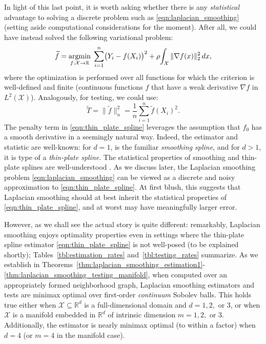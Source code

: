 \documentclass[twoside]{article}
\newcommand{\Reals}{\mathbb{R}}
\newcommand{\1}{\mathbf{1}}
\DeclareMathOperator*{\argmin}{argmin}
\newcommand{\Rd}{\Reals^d}
\newcommand{\Xset}{\mathcal{X}}
\newcommand{\wt}[1]{\widetilde{#1}}
\newcommand{\wh}[1]{\widehat{#1}}
\theoremstyle{definition}
\theoremstyle{remark}
\begin{document}
In light of this last point, it is worth asking whether there is any \emph{statistical} advantage to solving a discrete problem such as \eqref{eqn:laplacian_smoothing} (setting aside computational considerations for the moment). After all, we could have instead solved the following variational problem:
\begin{equation}
\label{eqn:thin_plate_spline}
\wt{f} = \argmin_{f : \Xset \to \Reals} \; \sum_{i = 1}^{n} \bigl(Y_i - f(X_i)\bigr)^2 + \rho \hspace{-2pt} \int_{\Xset} \|\nabla f(x)\|_2^2 \,dx,
\end{equation}
where the optimization is performed over all functions for which the criterion is well-defined and finite (continuous functions $f$ that have a weak derivative $\nabla f$ in $L^2(\Xset)$). Analogously, for testing, we could use:
\begin{equation}
\label{eqn:thin_plate_spline_test}
\wt{T} = \| \wt{f} \|_n^2 = \frac{1}{n} \sum_{i=1}^n \wt{f}(X_i)^2.
\end{equation}
The penalty term in \eqref{eqn:thin_plate_spline} leverages the assumption that $f_0$ has a smooth derivative in a seemingly natural way. Indeed, the estimator \smash{$\wt{f}$} and statistic \smash{$\wt{T}$} are well-known: for $d = 1$, \smash{$\wt{f}$} is the familiar \emph{smoothing spline}, and for $d>1$, it is type of a \emph{thin-plate spline}. The statistical properties of smoothing and thin-plate splines are well-understood \citep{vandergeer2000,liu2019}. As we discuss later, the Laplacian smoothing problem \eqref{eqn:laplacian_smoothing} can be viewed as a discrete and noisy approximation to \eqref{eqn:thin_plate_spline}. At first blush, this suggests that Laplacian smoothing should at best inherit the statistical properties of \eqref{eqn:thin_plate_spline}, and at worst may have meaningfully larger error.

However, as we shall see the actual story is quite different: remarkably, Laplacian smoothing enjoys optimality properties even in settings where the thin-plate spline estimator \eqref{eqn:thin_plate_spline} is not well-posed (to be explained shortly); Tables~\ref{tbl:estimation_rates} and~\ref{tbl:testing_rates} summarize. As we establish in Theorems~\ref{thm:laplacian_smoothing_estimation1}-\ref{thm:laplacian_smoothing_testing_manifold}, when computed over an appropriately formed neighborhood graph, Laplacian smoothing estimators and tests are minimax optimal over first-order \emph{continuum} Sobolev balls. This holds true either when $\Xset \subseteq \Rd$ is a full-dimensional domain and $d = 1,2,$ or $3$, or when $\Xset$ is a manifold embedded in $\Rd$ of intrinsic dimension $m = 1,2,$ or $3$. Additionally, the estimator \smash{$\wh{f}$} is nearly minimax optimal (to within a  factor) when $d=4$ (or $m=4$ in the manifold case). 
\end{document}
